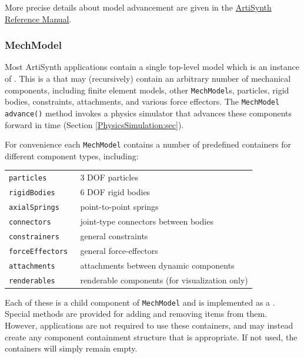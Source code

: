 More precise details about model advancement are given in the 
\href{../artisynth/artisynth.html}{
ArtiSynth Reference Manual}.

\subsubsection{MechModel}
\label{MechModel:sec}

Most ArtiSynth applications contain a single top-level model which is
an instance of .  This
is a  that may
(recursively) contain an arbitrary number of mechanical components,
including finite element models, other {\tt MechModel}s, particles,
rigid bodies, constraints, attachments, and various force effectors.
The {\tt MechModel} {\tt advance()} method invokes a physics simulator
that advances these components forward in time (Section
\ref{PhysicsSimulation:sec}).

For convenience each {\tt MechModel} contains a number of predefined
containers for different component types, including:

\begin{shadedregion}
\begin{tabular}{ll}
\tt particles & 3 DOF particles \\
\tt rigidBodies & 6 DOF rigid bodies \\
\tt axialSprings & point-to-point springs \\
\tt connectors & joint-type connectors between bodies \\
\tt constrainers & general constraints \\
\tt forceEffectors & general force-effectors \\
\tt attachments & attachments between dynamic components \\
\tt renderables & renderable components (for visualization only) \\
\end{tabular}
\end{shadedregion}
Each of these is a child component of {\tt MechModel} and is
implemented as a
. Special methods
are provided for adding and removing items from them. However,
applications are not required to use these containers, and may instead
create any component containment structure that is appropriate.
If not used, the containers will simply remain empty.

